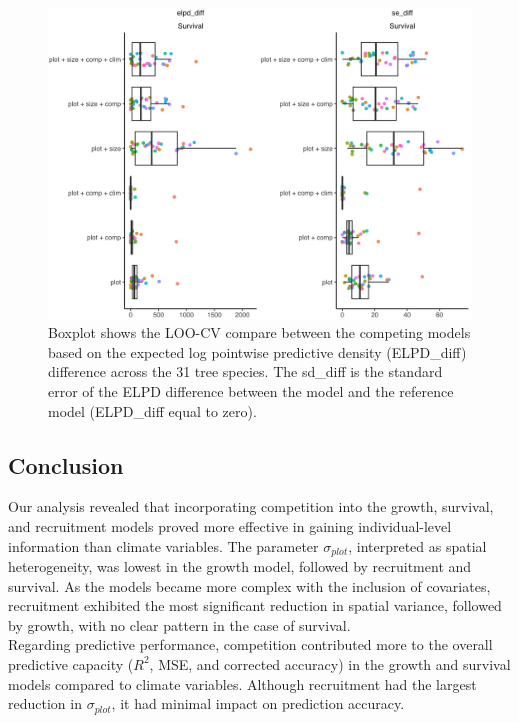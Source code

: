 \hypertarget{fig:loo_mort}{%
\begin{figure}
\centering
\includegraphics{manuscript/figs/supp1_6.png}
\caption[{Boxplot shows the LOO-CV compare between the competing models
based on the expected log pointwise predictive density (ELPD\_diff)
difference across the 31 tree species.}]{Boxplot shows the LOO-CV
compare between the competing models based on the expected log pointwise
predictive density (ELPD\_diff) difference across the 31 tree species.
The sd\_diff is the standard error of the ELPD difference between the
model and the reference model (ELPD\_diff equal to zero).}
\label{fig:loo_mort}
\end{figure}
}

\hypertarget{conclusion}{%
\subsection{Conclusion}\label{conclusion}}

Our analysis revealed that incorporating competition into the growth,
survival, and recruitment models proved more effective in gaining
individual-level information than climate variables. The parameter
\(\sigma_{plot}\), interpreted as spatial heterogeneity, was lowest in
the growth model, followed by recruitment and survival. As the models
became more complex with the inclusion of covariates, recruitment
exhibited the most significant reduction in spatial variance, followed
by growth, with no clear pattern in the case of survival.\\

Regarding predictive performance, competition contributed more to the
overall predictive capacity (\(R^2\), MSE, and corrected accuracy) in
the growth and survival models compared to climate variables. Although
recruitment had the largest reduction in \(\sigma_{plot}\), it had
minimal impact on prediction accuracy.\\

